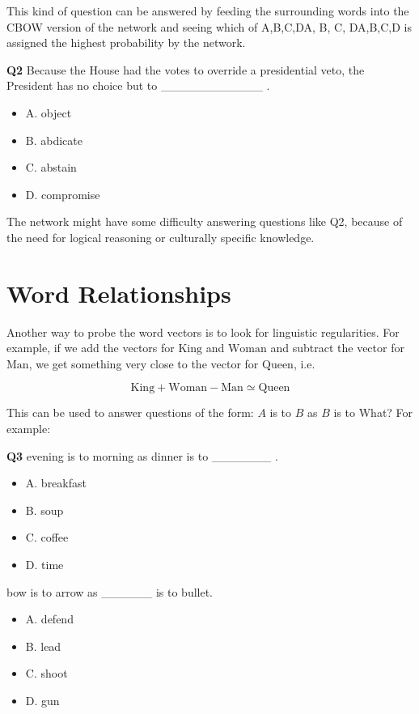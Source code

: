\documentclass[11pt]{article}
\begin{document}
This kind of question can be answered by feeding the surrounding words into the CBOW version of the network and seeing which of A,B,C,D{\rm A, B, C, D}A,B,C,D is assigned the highest probability by the network.

\textbf{Q2}
Because the House had the votes to override a presidential veto, the President has no choice but to ____________ .

\begin{itemize}
  \item A. object
  \item B. abdicate
  \item C. abstain
  \item D. compromise
\end{itemize}

The network might have some difficulty answering questions like Q2, because of the need for logical reasoning or culturally specific knowledge.

\section{Word Relationships}\label{sec:word-relationships2}
Another way to probe the word vectors is to look for linguistic regularities.
For example, if we add the vectors for $\text{King}$ and $\text{Woman}$ and subtract the vector for $\text{Man}$, we get something very close to the vector for $\text{Queen}$, i.e.

\[\text{King} + \text{Woman} - \text{Man} \simeq \text{Queen}\]

This can be used to answer questions of the form: $A$ is to $B$ as $B$ is to What?
For example:

\textbf{Q3}
evening is to morning as dinner is to _______ .
\begin{itemize}
  \item A. breakfast
  \item B. soup
  \item C. coffee
  \item D. time
\end{itemize}

bow is to arrow as ______ is to bullet.

\begin{itemize}
  \item A. defend
  \item B. lead
  \item C. shoot
  \item D. gun
\end{itemize}
\end{document}
